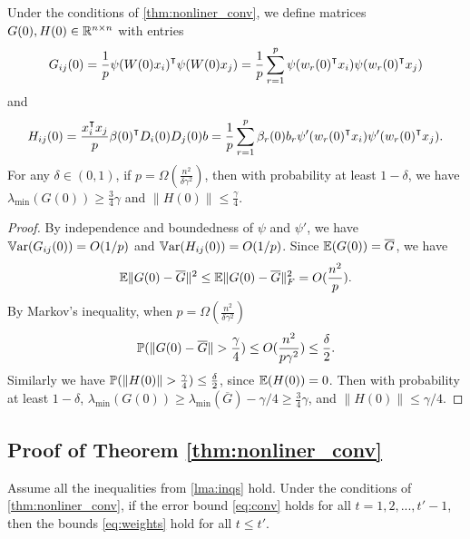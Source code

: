 \begin{lemma}
\label{lma:GH}
Under the conditions of \cref{thm:nonliner_conv}, we define matrices $G(0),H(0)\in\mathbb{R}^{n\times n}$ with entries
\begin{equation}
\label{eq:def_G0}
G_{ij}(0) = \frac{1}{p}\psi(W(0)x_i)\transpose \psi(W(0)x_j) = \frac{1}{p}\sum_{r=1}^p\psi(w_r(0)\transpose x_i)\psi(w_r(0)\transpose x_j)
\end{equation}
and
\begin{equation}
\label{eq:def_H0}
H_{ij}(0) = \frac{x_i\transpose x_j}{p}\beta(0)\transpose D_i(0)D_j(0)b = \frac{1}{p}\sum_{r=1}^p\beta_r(0)b_r\psi'(w_r(0)\transpose x_i)\psi'(w_r(0)\transpose x_j).
\end{equation}
For any $\delta \in (0,1)$, if $p=\Omega(\frac{n^2}{\delta\gamma^2})$, then with probability at least $1-\delta$, we have $\lambda_{\min}(G(0))\geq \frac{3}{4}\gamma$ and $\|H(0)\|\leq \frac{\gamma}{4}$.
\end{lemma}
\begin{proof}
By independence and boundedness of $\psi$ and $\psi'$, we have $\mathbb{V}\mathrm{ar}(G_{ij}(0)) = O(1/p)$ and $\mathbb{V}\mathrm{ar}(H_{ij}(0)) = O(1/p)$. Since $\mathbb{E}(G(0))=\overline{G}$, we have
\begin{equation*}
\mathbb{E}\|G(0)-\overline{G}\|^2 \leq \mathbb{E}\|G(0)-\overline{G}\|^2_F = O(\frac{n^2}{p}).
\end{equation*}
By Markov's inequality, when $p=\Omega(\frac{n^2}{\delta\gamma^2})$
\begin{equation*}
    \prob(\|G(0)-\overline{G}\|>\frac{\gamma}{4})\leq O(\frac{n^2}{p\gamma^2})\leq\frac{\delta}{2}.
\end{equation*}
Similarly we have $\prob(\|H(0)\|>\frac{\gamma}{4})\leq\frac{\delta}{2}$, since $\mathbb{E}(H(0))=0$. Then with probability at least $1-\delta$, $\lambda_{\min}(G(0)) \geq \lambda_{\min}(\overline{G}) -\gamma/4 \geq \frac{3}{4}\gamma$, and $\|H(0)\|\leq \gamma/4$.
\end{proof}

\subsection{Proof of Theorem \ref{thm:nonliner_conv}}

\begin{lemma}
\label{lma:weights}
Assume all the inequalities from \cref{lma:inqs} hold. Under the conditions of \cref{thm:nonliner_conv}, if the error bound \eqref{eq:conv} holds for all $t=1,2,...,t'-1$, then the bounds \eqref{eq:weights} hold for all $t\leq t'$.
\end{lemma}

